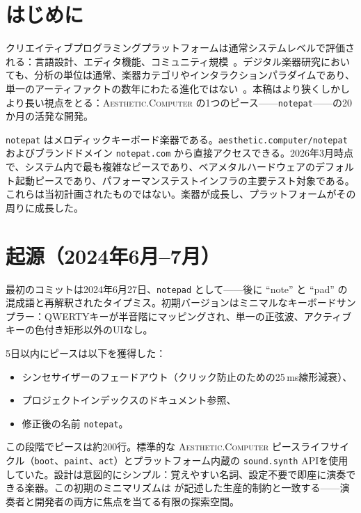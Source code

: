 \documentclass[10pt,letterpaper,twocolumn]{article}
\newcommand{\ac}{\textsc{Aesthetic.Computer}}
\begin{document}
\section{はじめに}

クリエイティブプログラミングプラットフォームは通常システムレベルで評価される：言語設計、エディタ機能、コミュニティ規模~\citep{reas2007processing,mccarthy2015p5js,resnick2009scratch}。デジタル楽器研究においても、分析の単位は通常、楽器カテゴリやインタラクションパラダイムであり、単一のアーティファクトの数年にわたる進化ではない~\citep{magnusson2010designing,marquez2018dmi}。本稿はより狭くしかしより長い視点をとる：\ac{} の1つのピース——\texttt{notepat}——の20か月の活発な開発。

\texttt{notepat} はメロディックキーボード楽器である。\texttt{aesthetic.computer/notepat} およびブランドドメイン \texttt{notepat.com} から直接アクセスできる。2026年3月時点で、システム内で最も複雑なピースであり、ベアメタルハードウェアのデフォルト起動ピースであり、パフォーマンステストインフラの主要テスト対象である。これらは当初計画されたものではない。楽器が成長し、プラットフォームがその周りに成長した。

\section{起源（2024年6月--7月）}

最初のコミットは2024年6月27日、\texttt{notepad} として——後に ``note'' と ``pad'' の混成語と再解釈されたタイプミス。初期バージョンはミニマルなキーボードサンプラー：QWERTYキーが半音階にマッピングされ、単一の正弦波、アクティブキーの色付き矩形以外のUIなし。

5日以内にピースは以下を獲得した：
\begin{itemize}
  \item シンセサイザーのフェードアウト（クリック防止のための25\,ms線形減衰）、
  \item プロジェクトインデックスのドキュメント参照、
  \item 修正後の名前 \texttt{notepat}。
\end{itemize}

この段階でピースは約200行。標準的な \ac{} ピースライフサイクル（\texttt{boot}、\texttt{paint}、\texttt{act}）とプラットフォーム内蔵の \texttt{sound.synth} APIを使用していた。設計は意図的にシンプル：覚えやすい名詞、設定不要で即座に演奏できる楽器。この初期のミニマリズムは \citet{magnusson2010designing} が記述した生産的制約と一致する——演奏者と開発者の両方に焦点を当てる有限の探索空間。
\end{document}
